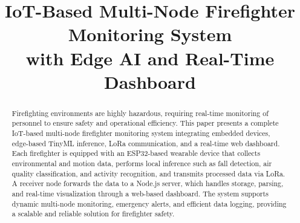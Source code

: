 \documentclass[conference]{IEEEtran}
\begin{document}
	
	\title{IoT-Based Multi-Node Firefighter Monitoring System\\
		with Edge AI and Real-Time Dashboard}
	
	\author{
		\and
	}
	
	\maketitle
	
	\begin{abstract}
		Firefighting environments are highly hazardous, requiring real-time monitoring
		of personnel to ensure safety and operational efficiency. This paper presents a
		complete IoT-based multi-node firefighter monitoring system integrating embedded
		devices, edge-based TinyML inference, LoRa communication, and a real-time web
		dashboard. Each firefighter is equipped with an ESP32-based wearable device that
		collects environmental and motion data, performs local inference such as fall
		detection, air quality classification, and activity recognition, and transmits
		processed data via LoRa. A receiver node forwards the data to a Node.js server,
		which handles storage, parsing, and real-time visualization through a web-based
		dashboard. The system supports dynamic multi-node monitoring, emergency alerts,
		and efficient data logging, providing a scalable and reliable solution for
		firefighter safety.
	\end{abstract}
	
\end{document}
